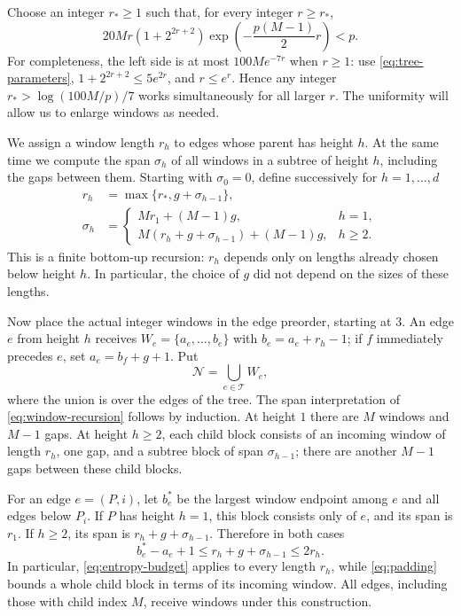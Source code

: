 Choose an integer $r_*\ge1$ such that, for every integer
$r\ge r_*$,
\begin{equation}
 20Mr(1+2^{2r+2})
       \exp\!\left(-\frac{p(M-1)}2r\right)<p.
 \label{eq:entropy-budget}
\end{equation}
For completeness, the left side is at most $100M e^{-7r}$ when $r\ge1$:
use \eqref{eq:tree-parameters},
$1+2^{2r+2}\le5e^{2r}$, and $r\le e^r$.
Hence any integer $r_*>\log(100M/p)/7$ works simultaneously for all
larger $r$.  The uniformity will allow us to enlarge windows as needed.

We assign a window length $r_h$ to edges whose parent has height $h$.
At the same time we compute the span $\sigma_h$ of all windows in a
subtree of height $h$, including the gaps between them.  Starting with
$\sigma_0=0$, define successively for $h=1,\ldots,d$
\begin{equation}
 \begin{split}
 r_h&=\max\{r_*,g+\sigma_{h-1}\},\\
 \sigma_h&=
 \begin{cases}
 Mr_1+(M-1)g,&h=1,\\
 M(r_h+g+\sigma_{h-1})+(M-1)g,&h\ge2.
 \end{cases}
 \end{split}
 \label{eq:window-recursion}
\end{equation}
This is a finite bottom-up recursion: $r_h$ depends only on lengths
already chosen below height $h$.  In particular, the choice of $g$ did
not depend on the sizes of these lengths.

Now place the actual integer windows in the edge preorder, starting at
$3$.  An edge $e$ from height $h$ receives
$W_e=\{a_e,\ldots,b_e\}$ with $b_e=a_e+r_h-1$; if $f$ immediately
precedes $e$, set $a_e=b_f+g+1$.  Put
\[
 \mathcal N=\bigcup_{e\in\mathcal T}W_e,
\]
where the union is over the edges of the tree.  The span interpretation
of \eqref{eq:window-recursion} follows by induction.  At height $1$
there are $M$ windows and $M-1$ gaps.  At height $h\ge2$, each child
block consists of an incoming window of length $r_h$, one gap, and a
subtree block of span $\sigma_{h-1}$; there are another $M-1$ gaps
between these child blocks.

For an edge $e=(P,i)$, let $b_e^*$ be the largest window endpoint among
$e$ and all edges below $P_i$.  If $P$ has height $h=1$, this block
consists only of $e$, and its span is $r_1$.  If $h\ge2$, its span is
$r_h+g+\sigma_{h-1}$.  Therefore in both cases
\begin{equation}
 b_e^*-a_e+1\le r_h+g+\sigma_{h-1}\le2r_h.
 \label{eq:padding}
\end{equation}
In particular, \eqref{eq:entropy-budget} applies to every length $r_h$,
while \eqref{eq:padding} bounds a whole child block in terms of its
incoming window.  All edges, including those with child index $M$,
receive windows under this construction.

